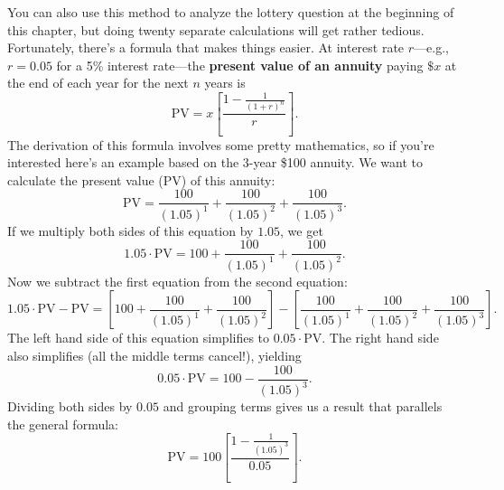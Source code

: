 You can also use this method to analyze the lottery question at the beginning of this chapter, but doing twenty separate calculations will get rather tedious. Fortunately, there's a formula that makes things easier. At interest rate $r$---e.g., $r=0.05$ for a 5\% interest rate---the \textbf{present value of an annuity} paying $\$x$ at
the end of each year for the next $n$ years is
\[
\mbox{PV}=x\left[ \frac{1 -
\displaystyle\frac{1}{(1+r)^n}}{r}\right].
\]
The derivation of this formula involves some pretty mathematics, so if you're interested here's an example based on the 3-year \$100 annuity. We want to calculate the present value (PV) of this annuity:
\[
\mbox{PV}=\frac{100}{(1.05)^1}+\frac{100}{(1.05)^2}+\frac{100}{(1.05)^3}.
\]
%
If we multiply both sides of this equation by $1.05$, we get
\[
1.05 \cdot
\mbox{PV}=100+\frac{100}{(1.05)^1}+\frac{100}{(1.05)^2}.
\]
%
Now we subtract the first equation from the second equation:
\[
1.05 \cdot \mbox{PV} - \mbox{PV}=\left[
100+\frac{100}{(1.05)^1}+\frac{100}{(1.05)^2} \right] - \left[
\frac{100}{(1.05)^1}+\frac{100}{(1.05)^2}+\frac{100}{(1.05)^3}
\right].
\]
%
The left hand side of this equation simplifies to $0.05 \cdot \mbox{PV}$. The right hand side also simplifies (all the middle terms cancel!), yielding
\[
0.05 \cdot \mbox{PV} =100 - \frac{100}{(1.05)^3}.
\]
%
Dividing both sides by $0.05$ and grouping terms gives us a result that parallels the general formula:
\[
\mbox{PV} =100\left[ \frac{1 -
\displaystyle\frac{1}{(1.05)^3}}{0.05}\right].
\]
%



